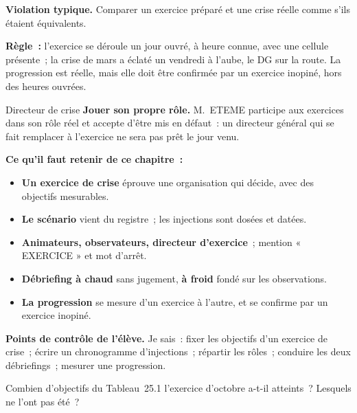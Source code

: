 \begin{boxalert}
\textbf{Violation typique.} Comparer un exercice préparé et une crise
réelle comme s'ils étaient équivalents.

\smallskip
\textbf{Règle~:} l'exercice se déroule un jour ouvré, à heure connue, avec
une cellule présente~; la crise de mars a éclaté un vendredi à l'aube, le
DG sur la route. La progression est réelle, mais elle doit être confirmée
par un exercice inopiné, hors des heures ouvrées.
\end{boxalert}

\begin{boxmetier}{Directeur de crise}
\textbf{Jouer son propre rôle.} M.~ETEME participe aux exercices dans son
rôle réel et accepte d'être mis en défaut~: un directeur général qui se
fait remplacer à l'exercice ne sera pas prêt le jour venu.
\end{boxmetier}

\separateur

\begin{boxresume}
\textbf{Ce qu'il faut retenir de ce chapitre~:}
\begin{itemize}
    \item \textbf{Un exercice de crise} éprouve une organisation qui
          décide, avec des objectifs mesurables.
    \item \textbf{Le scénario} vient du registre~; les injections sont
          dosées et datées.
    \item \textbf{Animateurs, observateurs, directeur d'exercice}~; mention
          « EXERCICE » et mot d'arrêt.
    \item \textbf{Débriefing à chaud} sans jugement, \textbf{à froid} fondé
          sur les observations.
    \item \textbf{La progression} se mesure d'un exercice à l'autre, et se
          confirme par un exercice inopiné.
\end{itemize}
\end{boxresume}

\begin{boxinfo}
\textbf{Points de contrôle de l'élève.} Je sais~: fixer les objectifs d'un
exercice de crise~; écrire un chronogramme d'injections~; répartir les
rôles~; conduire les deux débriefings~; mesurer une progression.
\end{boxinfo}

\bigskip

\begin{boxexo}[title={\ding{45}\quad Exercice~25.1. Les objectifs \niveaubase}]
Combien d'objectifs du Tableau~25.1 l'exercice d'octobre a-t-il atteints~?
Lesquels ne l'ont pas été~?
\end{boxexo}

